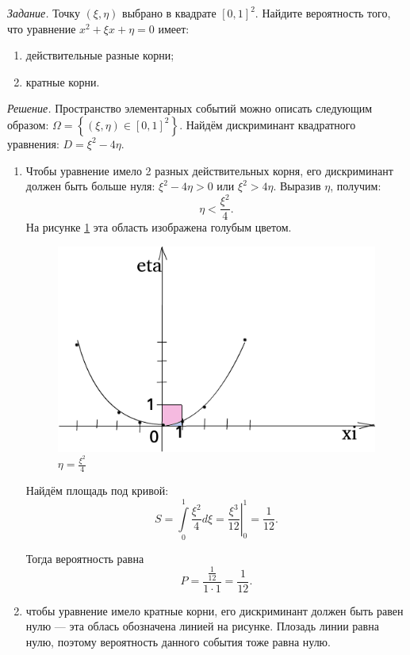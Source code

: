 \textit{Задание.} Точку $ \left( \xi, \eta \right) $ выбрано в квадрате $ \left[ 0, 1 \right]^2$.
Найдите вероятность того, что уравнение $x^2 + \xi x + \eta = 0$ имеет:
\begin{enumerate}[label=\alph*)]
\item действительные разные корни;
\item кратные корни.
\end{enumerate}

\textit{Решение.}
Пространство элементарных событий можно описать следующим образом:
$ \Omega =
\left\{ \left( \xi, \eta \right) \in \left[ 0, 1 \right]^2 \right\} $.
Найдём дискриминант квадратного уравнения: $D = \xi^2 - 4 \eta $.

\begin{enumerate}[label=\alph*)]
\item Чтобы уравнение имело 2 разных действительных корня, его дискриминант должен быть больше нуля: $ \xi^2 - 4 \eta > 0$ или $ \xi^2 > 4 \eta $.
Выразив $ \eta $, получим:
$$ \eta < \frac{ \xi^2}{4}.$$
На рисунке \ref{fig:48} эта область изображена голубым цветом.

\begin{figure}[h!]
  \centering
  \includegraphics[width=.7\textwidth]{./pictures/4_8.png}
  \caption{$ \eta = \frac{ \xi^2}{4}$}
  \label{fig:48}
\end{figure}

Найдём площадь под кривой:
$$S =
\int \limits_0^1 \frac{ \xi^2}{4}d \xi =
\left. \frac{ \xi^3}{12} \right|_0^1 =
\frac{1}{12}.$$

Тогда вероятность равна
$$P =
\frac{ \frac{1}{12} }{1 \cdot 1} =
\frac{1}{12}.$$

\item чтобы уравнение имело кратные корни, его дискриминант должен быть равен нулю --- эта облась обозначена линией на рисунке.
Плозадь линии равна нулю, поэтому вероятность данного события тоже равна нулю.
\end{enumerate}

